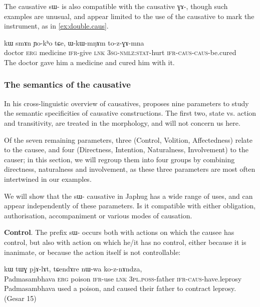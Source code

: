 \documentclass[oldfontcommands,oneside,a4paper,11pt]{article}
\newcommand{\ipa}[1]{{\phon \mbox{#1}}} %
\newcommand{\sg}{\textsc{sg}}
\newcommand{\pl}{\textsc{pl}}
\newcommand{\wav}[1]{}%
\newcommand{\caus}{\textsc{caus}}
\newcommand{\lnk}{\textsc{lnk}}
\newcommand{\erg}{\textsc{erg}}
\newcommand{\evd}{\textsc{ifr}}
\newcommand{\nmlz}{\textsc{nmlz}}
\newcommand{\poss}{\textsc{poss}}
\newcommand{\stat}{\textsc{stat}}
\begin{document}
The causative \ipa{sɯ-} is also compatible with the causative \ipa{ɣɤ-}, though such examples are unusual, and appear limited to the use of  the causative to mark the instrument, as in \ref{ex:double.caus}.
 \begin{exe}
\ex  \label{ex:double.caus}
\gll \ipa{smɤnba} 	\ipa{kɯ} 	\ipa{smɤn} 	\ipa{ɲo-kʰo} 	\ipa{tɕe,} 	\ipa{ɯ-kɯ-mŋɤm} 	\ipa{to-z-ɣɤ-mna}    \\
  doctor \erg{} medicine \evd{}-give \lnk{} 3\sg{}-\nmlz{}:\stat{}-hurt \evd{}-\caus{}-\caus{}-be.cured \\
\glt The doctor gave him a medicine and cured him with it. \wav{8_zGAmna}
\end{exe}
 


\subsubsection{The semantics of the causative } \label{subsub:caus.semantics}
In his cross-linguistic overview of causatives, \citet[62-68]{dixon00causative} proposes nine parameters to study the semantic specificities of causative constructions. The first two, state vs. action and transitivity, are treated in the morphology, and will not concern us here. 

Of the seven remaining parameters, three (Control, Volition, Affectedness) relate to the causee, and four (Directness, Intention, Naturalness, Involvement) to the causer; in this section, we will regroup them into four groups by combining directness, naturalness and involvement, as these three parameters are most often intertwined in our examples.

 
 We will show that the \ipa{sɯ-} causative in Japhug has a wide range of uses, and can appear independently of these parameters. Is it compatible with either obligation, authorisation, accompaniment or various modes of causation. 
 
   \textbf{Control}. The prefix \ipa{sɯ-} occurs both with actions on which the causee has control, but also with action on which he/it has no control, either because it is inanimate, or because the action itself is not controllable:
 \begin{exe}
\ex 
\gll  \ipa{ɯrɟɤnpanma} 	\ipa{kɯ} 	\ipa{tɯɣ} 	\ipa{pjɤ-lɤt,} 	\ipa{tɕendɤre} 	\ipa{nɯ-wa} 	\ipa{ko-z-nɤndza,}  \\
Padmasambhava \erg{} poison \evd{}-use \lnk{} 3\pl{}.\poss{}-father \evd{}-\caus{}-have.leprosy \\
 \glt Padmasambhava used a poison, and caused their father to contract leprosy.    (Gesar 15)
\end{exe}
\end{document}
